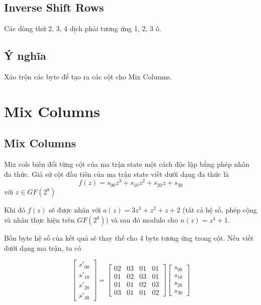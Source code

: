 \subsection{Inverse Shift Rows}

Các dòng thứ 2, 3, 4 dịch phải tương ứng 1, 2, 3 ô.

\subsection{Ý nghĩa}

Xáo trộn các byte để tạo ra các cột cho Mix Columns.

\section{Mix Columns}

\subsection{Mix Columns}

Mix cols biến đổi từng cột của ma trận state một cách độc lập bằng phép nhân đa thức. Giả sử cột đầu tiên của ma trận state viết dưới dạng đa thức là
\[f(z) = s_{00} z^3 + s_{10} z^2 + s_{20} z + s_{30} \] với $z \in GF(2^8)$

Khi đó $f(z)$ sẽ được nhân với $a(z) = 3z^3 + z^2 + z + 2$ (tất cả hệ số, phép cộng và nhân thực hiện trên $GF(2^8)$) và sau đó modulo cho $n(z) = z^4 + 1$.

Bốn byte hệ số của kết quả sẽ thay thế cho 4 byte tương ứng trong cột. Nếu viết dưới dạng ma trận, ta có

\[ \begin{bmatrix}
    s'_{00} \\ s'_{10} \\ s'_{20} \\ s'_{30}
\end{bmatrix} = \begin{bmatrix}
    02 & 03 & 01 & 01 \\
    01 & 02 & 03 & 01 \\
    01 & 01 & 02 & 03 \\
    03 & 01 & 01 & 02
\end{bmatrix} 
\begin{bmatrix}
    s_{00} \\ s_{10} \\ s_{20} \\ s_{30}
\end{bmatrix}\]

